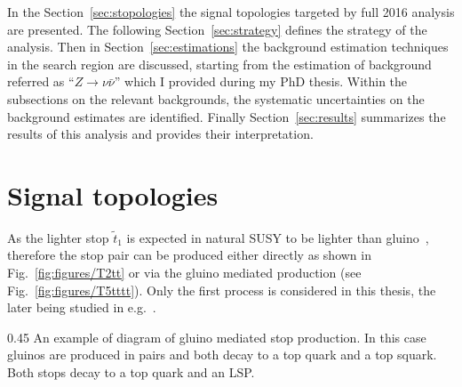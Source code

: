 In the Section~\ref{sec:stopologies} the signal topologies targeted by full 2016 analysis are presented. The following Section~\ref{sec:strategy} defines the strategy of the analysis.  Then in Section~\ref{sec:estimations} the background estimation techniques in the search region are discussed, starting from the estimation of background referred as ``$Z \to \nu \bar{\nu}$'' which I provided during my PhD thesis. Within the subsections on the relevant backgrounds, the systematic uncertainties on the background estimates are identified. Finally Section~\ref{sec:results} summarizes the results of this analysis and provides their interpretation. 







\section{Signal topologies~\label{sec:stopologies}}

As the lighter stop $\tilde{t}_{1}$ is expected in natural SUSY to be lighter than gluino~\cite{Martin:2008aw}, therefore  the stop pair can be produced either directly as shown in Fig.~\ref{fig:figures/T2tt} or via the gluino mediated production (see Fig.~\ref{fig:figures/T5tttt}). Only the first process is considered in this thesis, the later being studied in e.g.~\cite{Sirunyan:2017pjw, Sirunyan:2017kqq}.

                {0.45}       %
                { An example of diagram of gluino mediated stop production. In this case gluinos are produced in pairs and both decay to a top quark and a top squark. Both stops decay to a top quark and an LSP. } %

